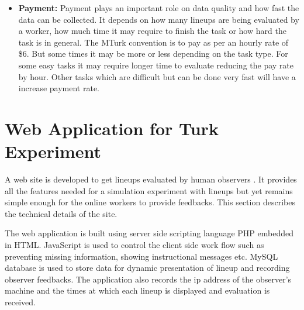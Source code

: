 \documentclass[11pt]{article}
\begin{document}
\begin{itemize}
\item {\bf Payment:} Payment plays an important role on data quality and how fast the data can be collected. It depends on how many lineups are being evaluated by a worker, how much time it may require to finish the task or how hard the task is in general. The MTurk convention is to pay as per an hourly rate of \$6. But some times it may be more or less depending on the task type. For some easy tasks it may require longer time to evaluate reducing the pay rate by hour. Other tasks which are difficult but can be done very fast will have a increase payment rate.

%
%
%
%
%
%

\end{itemize}


\section{Web Application for Turk Experiment} \label{sec:web_application}

A web site is developed to get lineups evaluated by human observers \citep{majumder:turk}. It provides all the features needed for a simulation experiment with lineups but yet remains simple enough for the online workers to provide feedbacks. This section describes the technical details of the site. 

The web application is built using server side scripting language PHP embedded in HTML. JavaScript is used to control the client side work flow such as preventing missing information, showing instructional messages etc. MySQL database is used to store data for dynamic presentation of lineup and recording observer feedbacks. The application also records the ip address of the observer's machine and the times at which each lineup is displayed and evaluation is received.  

\end{document}
